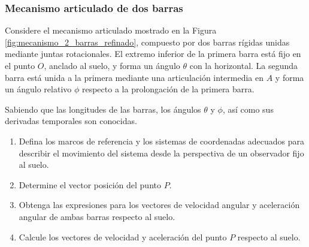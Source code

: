 \subsubsection{Mecanismo articulado de dos barras}
Considere el mecanismo articulado mostrado en la Figura \ref{fig:mecanismo_2_barras_refinado}, compuesto por dos barras rígidas unidas mediante juntas rotacionales. El extremo inferior de la primera barra está fijo en el punto $O$, anclado al suelo, y forma un ángulo $\theta$ con la horizontal. La segunda barra está unida a la primera mediante una articulación intermedia en $A$ y forma un ángulo relativo $\phi$ respecto a la prolongación de la primera barra.

Sabiendo que las longitudes de las barras, los ángulos $\theta$ y $\phi$, así como sus derivadas temporales son conocidas.
\begin{enumerate}
    \item Defina los marcos de referencia y los sistemas de coordenadas adecuados para describir el movimiento del sistema desde la perspectiva de un observador fijo al suelo.
    \item Determine el vector posición del punto $P$.
    \item Obtenga las expresiones para los vectores de velocidad angular y aceleración angular de ambas barras respecto al suelo.
    \item Calcule los vectores de velocidad y aceleración del punto $P$ respecto al suelo.
\end{enumerate}

